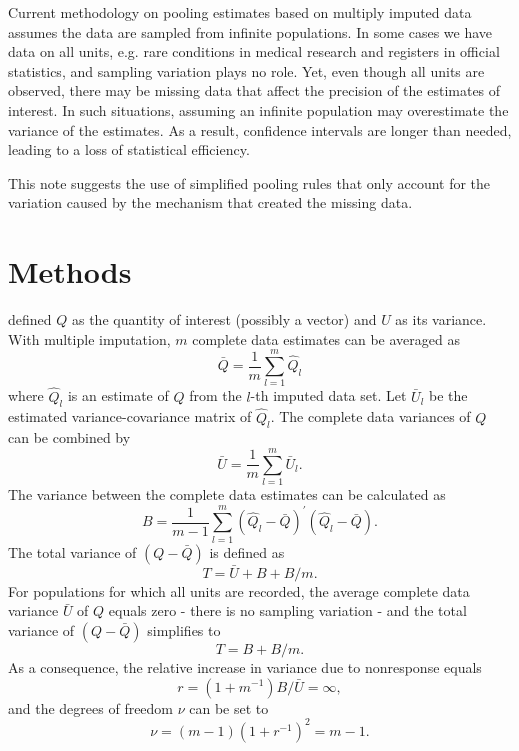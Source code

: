 \documentclass[12pt, a4paper]{article}
\begin{document}
Current methodology on pooling estimates based on multiply imputed data assumes the data are sampled from infinite populations. In some cases we have data on all units, e.g. rare conditions in medical research and registers in official statistics, and sampling variation plays no role. Yet, even though all units are observed, there may be missing data that affect the precision of the estimates of interest. In such situations, assuming an infinite population may overestimate the variance of the estimates. As a result, confidence intervals are longer than needed, leading to a loss of statistical efficiency. 

This note suggests the use of simplified pooling rules that only account for the variation caused by the mechanism that created the missing data. 

\section*{Methods}
\citet[p. 76]{RubinD1987} defined $Q$ as the quantity of interest (possibly a vector) and $U$ as its variance. With multiple imputation, $m$ complete data estimates can be averaged as
\begin{equation}
\bar{Q}=\frac{1}{m}\sum^{m}_{l=1}{ \hat{Q}}_{l}
\end{equation}
where $\hat Q_l$ is an estimate of $Q$ from the $l$-th imputed
data set. Let $\bar U_l$ be the estimated variance-covariance matrix of
$\hat Q_l$. The complete data variances of $ Q$ can be combined by
\begin{equation}
\bar{U}=\frac{1}{m}\sum^{m}_{l=1}{ {\bar U}}_{l}. 
\end{equation}
The variance between the complete data estimates can be calculated as
\begin{equation}
B=\frac{1}{m-1}\sum^{m}_{l=1}(\hat{ Q}_l-\bar{Q})^\prime(\hat{ Q}_l-\bar{Q}).
\end{equation}
The total variance of $({ Q}-\bar{Q})$ is defined as 
\begin{equation}
T=\bar{U}+B+B/m. 
\end{equation}
For populations for which all units are recorded, the average complete data variance $\bar{U}$ of $ Q$ equals zero - there is no sampling variation - and the total variance of $({ Q}-\bar{Q})$ simplifies to 
\begin{equation}
T=B+B/m. 
\end{equation}
As a consequence, the relative increase in variance due to nonresponse equals
\begin{equation}
r = (1+{m^{-1}}) B/\bar{U}= \infty, 
\end{equation}
and the degrees of freedom $\nu$ can be set to
\begin{equation}
\nu = (m-1)(1+r^{-1})^2=m-1.
\end{equation}
\end{document}
